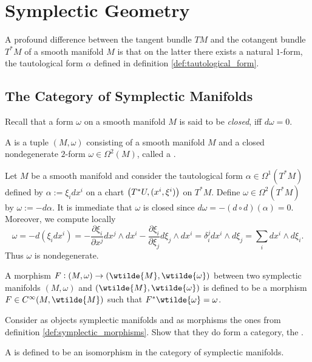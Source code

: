\section*{Symplectic Geometry}
A profound difference between the tangent bundle $TM$ and the cotangent bundle $T^*M$ of a smooth manifold $M$ is that on the latter there exists a natural $1$-form, the tautological form $\alpha$ defined in definition \ref{def:tautological_form}. 

\subsection*{The Category of Symplectic Manifolds}
Recall that a form $\omega$ on a smooth manifold $M$ is said to be \emph{closed}, iff $d\omega = 0$.

\begin{definition}
	A  is a tuple $(M,\omega)$ consisting of a smooth manifold $M$ and a closed nondegenerate $2$-form $\omega \in \Omega^2(M)$, called a .
\end{definition}

\begin{example}
	Let $M$ be a smooth manifold and consider the tautological form $\alpha \in \Omega^1(T^*M)$ defined by $\alpha := \xi_i dx^i$ on a chart $\del[1]{T^*U, (x^i,\xi^i)}$ on $T^*M$. Define $\omega \in \Omega^2(T^*M)$ by $\omega := -d\alpha$. It is immediate that $\omega$ is closed since $d\omega = -(d \circ d)(\alpha) = 0$. Moreover, we compute locally
	\begin{equation*}
		\omega = -d(\xi_idx^i) = -\frac{\partial \xi_i}{\partial x^j} dx^j \wedge dx^i - \frac{\partial \xi_i}{\partial \xi_j} d\xi_j \wedge dx^i = \delta^j_i dx^i \wedge d\xi_j = \sum_i dx^i \wedge d\xi_i.
	\end{equation*}
	Thus $\omega$ is nondegenerate. 
\end{example}

\begin{definition}
	\label{def:symplectic_morphisms}
	A morphism $F : (M,\omega) \to (\wtilde{M},\wtilde{\omega})$ between two symplectic manifolds $(M,\omega)$ and $(\wtilde{M},\wtilde{\omega})$ is defined to be a morphism $F \in C^\infty(M,\wtilde{M})$ such that $F^*\wtilde{\omega} = \omega$. 
\end{definition}

\begin{exercise}
	Consider as objects symplectic manifolds and as morphisms the ones from definition \ref{def:symplectic_morphisms}. Show that they do form a category, the .
\end{exercise}

\begin{definition}[Symplectomorphism]
	A  is defined to be an isomorphism in the category of symplectic manifolds.
\end{definition}
